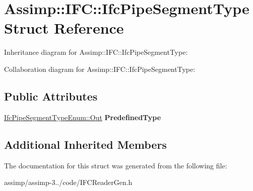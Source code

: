 \hypertarget{struct_assimp_1_1_i_f_c_1_1_ifc_pipe_segment_type}{\section{Assimp\+:\+:I\+F\+C\+:\+:Ifc\+Pipe\+Segment\+Type Struct Reference}
\label{struct_assimp_1_1_i_f_c_1_1_ifc_pipe_segment_type}
}


Inheritance diagram for Assimp\+:\+:I\+F\+C\+:\+:Ifc\+Pipe\+Segment\+Type\+:


Collaboration diagram for Assimp\+:\+:I\+F\+C\+:\+:Ifc\+Pipe\+Segment\+Type\+:
\subsection*{Public Attributes}
\begin{DoxyCompactItemize}
\item 
\hypertarget{struct_assimp_1_1_i_f_c_1_1_ifc_pipe_segment_type_aaf1ab57a786929f62fb7c43effb3e80e}{\hyperlink{classboost_1_1shared__ptr}{Ifc\+Pipe\+Segment\+Type\+Enum\+::\+Out} {\bfseries Predefined\+Type}}\label{struct_assimp_1_1_i_f_c_1_1_ifc_pipe_segment_type_aaf1ab57a786929f62fb7c43effb3e80e}

\end{DoxyCompactItemize}
\subsection*{Additional Inherited Members}


The documentation for this struct was generated from the following file\+:\begin{DoxyCompactItemize}
\item 
assimp/assimp-\/3../code/I\+F\+C\+Reader\+Gen.\+h\end{DoxyCompactItemize}
